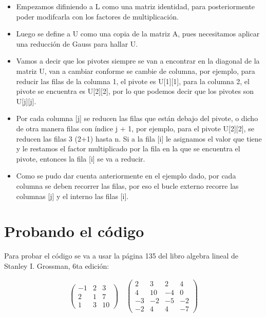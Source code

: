 \documentclass[letterpaper,12pt]{article}
\begin{document}
\begin{itemize}
    \item Empezamos difiniendo a L como una matriz identidad, para posteriormente poder modifcarla con los factores de multiplicación.
    \item Luego se define a U como una copia de la matriz A, pues necesitamos aplicar una reducción de Gauss para hallar U.
    \item Vamos a decir que los pivotes siempre se van a encontrar en la diagonal de la matriz U, van a cambiar conforme se cambie de columna, por ejemplo, para reducir las filas de la columna 1, el pivote es U[1][1], para la columna 2, el pivote se encuentra es U[2][2], por lo que podemos decir que los pivotes son U[j][j].
    \item Por cada columna [j] se reducen las filas que están debajo del pivote, o dicho de otra manera filas con índice j + 1, por ejemplo, para el pivote U[2][2], se reducen las filas 3 (2+1) hasta n. Si a la fila [i] le asignamos el valor que tiene y le restamos el factor multiplicado por la fila en la que se encuentra el pivote, entonces la fila [i] se va a reducir.
    \item Como se pudo dar cuenta anteriormente en el ejemplo dado, por cada columna se deben recorrer las filas, por eso el bucle externo recorre las columnas [j] y el interno las filas [i].
\end{itemize}

\section*{Probando el código}
Para probar el código se va a usar la página 135 del libro algebra lineal de Stanley I. Grossman, 6ta edición:

\begin{align*}
    \begin{pmatrix}
        -1 & 2 & 3 \\
        2 & 1 & 7 \\
        1 & 3 & 10
    \end{pmatrix}
    \quad
    \begin{pmatrix}
        2 & 3 & 2 & 4 \\
        4 & 10 & -4 & 0 \\
        -3 & -2 & -5 & -2 \\
        -2 & 4 & 4 & -7
    \end{pmatrix}
\end{align*}
\end{document}
